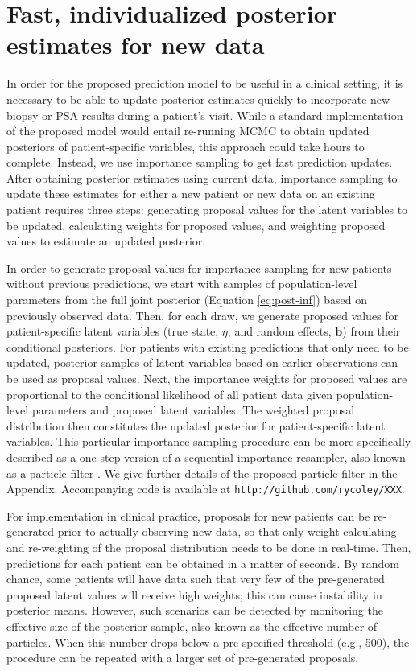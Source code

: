 \documentclass[12pt, letterpaper]{article}
\newcommand{\bmb}{\mathbf{b}}
\begin{document}
\section{Fast, individualized posterior estimates for new data}
In order for the proposed prediction model to be useful in a clinical setting, it is necessary to be able to update posterior estimates quickly  to incorporate new biopsy or PSA results during a patient's visit. While a standard implementation of the proposed model would entail re-running MCMC to obtain updated posteriors of patient-specific variables, this approach could take hours to complete. Instead, we use importance sampling \cite{Bishop2006} to get fast prediction updates. After obtaining posterior estimates using current data, importance sampling to update these estimates for either a new patient or new data on an existing patient requires three steps: generating proposal values for the latent variables to be updated, calculating weights for proposed values, and weighting proposed values to estimate an updated posterior.

In order to generate proposal values for importance sampling for new patients without previous predictions, we start with samples of population-level parameters from the full joint posterior (Equation \ref{eq:post-inf}) based on previously observed data. Then, for each draw, we generate proposed values for patient-specific latent variables (true state, $\eta$, and random effects, $\bmb$) from their conditional posteriors. For patients with existing predictions that only need to be updated, posterior samples of latent variables based on earlier observations can be used as proposal values. Next, the importance weights for proposed values are proportional to the conditional likelihood of all patient data given population-level parameters and proposed latent variables. The weighted proposal distribution then constitutes the updated posterior for patient-specific latent variables. This particular importance sampling procedure can be more specifically described as a one-step version of a sequential importance resampler, also known as a particle filter \cite{Bishop2006}. We give further details of the proposed particle filter in the Appendix. Accompanying code is available at \texttt{http://github.com/rycoley/XXX}.


For implementation in clinical practice, proposals for new patients can be re-generated prior to actually observing new data, so that only weight calculating and re-weighting of the proposal distribution needs to be done in real-time. Then, predictions for each patient can be obtained in a matter of seconds. By random chance, some patients will have data such that very few of the pre-generated proposed latent values will receive high weights; this can cause instability in posterior means. However, such scenarios can be detected by monitoring the effective size of the posterior sample, also known as the effective number of particles. When this number drops below a pre-specified threshold (e.g., 500), the procedure can be repeated with a larger set of pre-generated proposals. 
\end{document}
